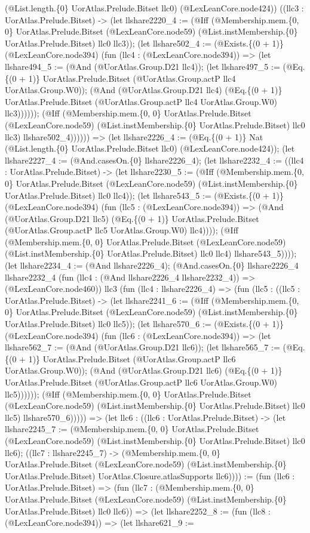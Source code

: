 \documentclass[11pt]{article}
\begin{document}
(@List.length.\{0\} UorAtlas.Prelude.Bitset llc0) (@LexLeanCore.node424)) ((llc3 : UorAtlas.Prelude.Bitset) -> (let llshare2220\_4 := (@Iff (@Membership.mem.\{0, 0\} UorAtlas.Prelude.Bitset (@LexLeanCore.node59) (@List.instMembership.\{0\} UorAtlas.Prelude.Bitset) llc0 llc3)); (let llshare502\_4 := (@Exists.\{(0 + 1)\} (@LexLeanCore.node394) (fun (llc4 : (@LexLeanCore.node394)) => (let llshare494\_5 := (@And (@UorAtlas.Group.D21 llc4)); (let llshare497\_5 := (@Eq.\{(0 + 1)\} UorAtlas.Prelude.Bitset (@UorAtlas.Group.actP llc4 UorAtlas.Group.W0)); (@And (@UorAtlas.Group.D21 llc4) (@Eq.\{(0 + 1)\} UorAtlas.Prelude.Bitset (@UorAtlas.Group.actP llc4 UorAtlas.Group.W0) llc3)))))); (@Iff (@Membership.mem.\{0, 0\} UorAtlas.Prelude.Bitset (@LexLeanCore.node59) (@List.instMembership.\{0\} UorAtlas.Prelude.Bitset) llc0 llc3) llshare502\_4)))))) => (let llshare2226\_4 := (@Eq.\{(0 + 1)\} Nat (@List.length.\{0\} UorAtlas.Prelude.Bitset llc0) (@LexLeanCore.node424)); (let llshare2227\_4 := (@And.casesOn.\{0\} llshare2226\_4); (let llshare2232\_4 := ((llc4 : UorAtlas.Prelude.Bitset) -> (let llshare2230\_5 := (@Iff (@Membership.mem.\{0, 0\} UorAtlas.Prelude.Bitset (@LexLeanCore.node59) (@List.instMembership.\{0\} UorAtlas.Prelude.Bitset) llc0 llc4)); (let llshare543\_5 := (@Exists.\{(0 + 1)\} (@LexLeanCore.node394) (fun (llc5 : (@LexLeanCore.node394)) => (@And (@UorAtlas.Group.D21 llc5) (@Eq.\{(0 + 1)\} UorAtlas.Prelude.Bitset (@UorAtlas.Group.actP llc5 UorAtlas.Group.W0) llc4)))); (@Iff (@Membership.mem.\{0, 0\} UorAtlas.Prelude.Bitset (@LexLeanCore.node59) (@List.instMembership.\{0\} UorAtlas.Prelude.Bitset) llc0 llc4) llshare543\_5)))); (let llshare2234\_4 := (@And llshare2226\_4); (@And.casesOn.\{0\} llshare2226\_4 llshare2232\_4 (fun (llc4 : (@And llshare2226\_4 llshare2232\_4)) => (@LexLeanCore.node460)) llc3 (fun (llc4 : llshare2226\_4) => (fun (llc5 : ((llc5 : UorAtlas.Prelude.Bitset) -> (let llshare2241\_6 := (@Iff (@Membership.mem.\{0, 0\} UorAtlas.Prelude.Bitset (@LexLeanCore.node59) (@List.instMembership.\{0\} UorAtlas.Prelude.Bitset) llc0 llc5)); (let llshare570\_6 := (@Exists.\{(0 + 1)\} (@LexLeanCore.node394) (fun (llc6 : (@LexLeanCore.node394)) => (let llshare562\_7 := (@And (@UorAtlas.Group.D21 llc6)); (let llshare565\_7 := (@Eq.\{(0 + 1)\} UorAtlas.Prelude.Bitset (@UorAtlas.Group.actP llc6 UorAtlas.Group.W0)); (@And (@UorAtlas.Group.D21 llc6) (@Eq.\{(0 + 1)\} UorAtlas.Prelude.Bitset (@UorAtlas.Group.actP llc6 UorAtlas.Group.W0) llc5)))))); (@Iff (@Membership.mem.\{0, 0\} UorAtlas.Prelude.Bitset (@LexLeanCore.node59) (@List.instMembership.\{0\} UorAtlas.Prelude.Bitset) llc0 llc5) llshare570\_6))))) => (let llc6 : ((llc6 : UorAtlas.Prelude.Bitset) -> (let llshare2245\_7 := (@Membership.mem.\{0, 0\} UorAtlas.Prelude.Bitset (@LexLeanCore.node59) (@List.instMembership.\{0\} UorAtlas.Prelude.Bitset) llc0 llc6); ((llc7 : llshare2245\_7) -> (@Membership.mem.\{0, 0\} UorAtlas.Prelude.Bitset (@LexLeanCore.node59) (@List.instMembership.\{0\} UorAtlas.Prelude.Bitset) UorAtlas.Closure.atlasSupports llc6)))) := (fun (llc6 : UorAtlas.Prelude.Bitset) => (fun (llc7 : (@Membership.mem.\{0, 0\} UorAtlas.Prelude.Bitset (@LexLeanCore.node59) (@List.instMembership.\{0\} UorAtlas.Prelude.Bitset) llc0 llc6)) => (let llshare2252\_8 := (fun (llc8 : (@LexLeanCore.node394)) => (let llshare621\_9 := 
\end{document}
